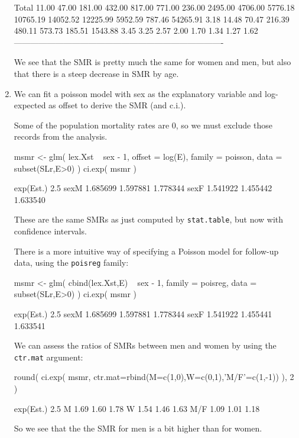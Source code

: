 \begin{enumerate}[resume]
\begin{Schunk}
\begin{Soutput}
                                                                              
 Total     11.00   47.00   181.00   432.00   817.00  771.00  236.00  2495.00  
         4706.00 5776.18 10765.19 14052.52 12225.99 5952.59  787.46 54265.91  
            3.18   14.48    70.47   216.39   480.11  573.73  185.51  1543.88  
            3.45    3.25     2.57     2.00     1.70    1.34    1.27     1.62  
 ---------------------------------------------------------------------------- 
\end{Soutput}
\end{Schunk}
  We see that the SMR is pretty much the same for women and men, but
  also that there is a steep decrease in SMR by age. 



\item We can fit a poisson model with sex as the explanatory variable and
  log-expected as offset to derive the SMR (and c.i.).

  Some of the population mortality rates are 0, so we must exclude
  those records from the analysis.
\begin{Schunk}
\begin{Sinput}
 msmr <- glm( lex.Xst ~ sex - 1,
              offset = log(E),
              family = poisson,
              data = subset(SLr,E>0) )
 ci.exp( msmr )
\end{Sinput}
\begin{Soutput}
     exp(Est.)     2.5%    97.5%
sexM  1.685699 1.597881 1.778344
sexF  1.541922 1.455442 1.633540
\end{Soutput}
\end{Schunk}
  These are the same SMRs as just computed by \texttt{stat.table},
  but now with confidence intervals.
     
There is a more intuitive way of specifying a Poisson model for
follow-up data, using the \texttt{poisreg} family:
\begin{Schunk}
\begin{Sinput}
 msmr <- glm( cbind(lex.Xst,E) ~ sex - 1,
              family = poisreg,
                data = subset(SLr,E>0) )
 ci.exp( msmr )
\end{Sinput}
\begin{Soutput}
     exp(Est.)     2.5%    97.5%
sexM  1.685699 1.597881 1.778344
sexF  1.541922 1.455441 1.633541
\end{Soutput}
\end{Schunk}
    We can assess the ratios of SMRs between men and women by using the
  \texttt{ctr.mat} argument:
\begin{Schunk}
\begin{Sinput}
 round( ci.exp( msmr, ctr.mat=rbind(M=c(1,0),W=c(0,1),'M/F'=c(1,-1)) ), 2 )
\end{Sinput}
\begin{Soutput}
    exp(Est.) 2.5% 97.5%
M        1.69 1.60  1.78
W        1.54 1.46  1.63
M/F      1.09 1.01  1.18
\end{Soutput}
\end{Schunk}
So we see that the the SMR for men is a bit higher than for women.  

\end{enumerate}

